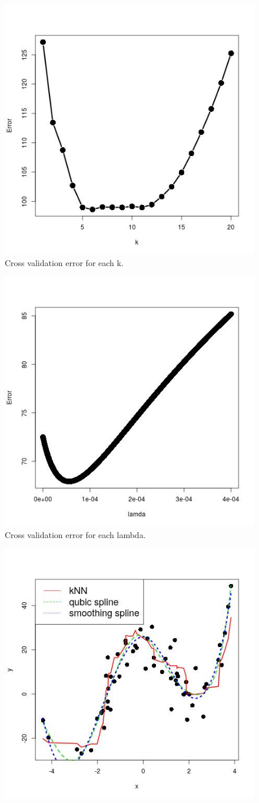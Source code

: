 \documentclass[a4paper, 10pt, english]{article}
\begin{document}
\begin{itemize}
		\begin{figure}[H]
		    \centering
		    \includegraphics[width=0.6\linewidth]{r-script/plots3/k_opt.jpg}
		    \caption{Cross validation error for each k.}
		    \label{fig3:k_opt}
		\end{figure}
		\begin{figure}[H]
		    \centering
		    \includegraphics[width=0.6\linewidth]{r-script/plots3/lambda_opt.jpg}
		    \caption{Cross validation error for each lambda.}
		    \label{fig3:lambda_opt}
		\end{figure}
		\begin{figure}[H]
		    \centering
		    \includegraphics[width=0.6\linewidth]{r-script/plots3/fitted_models.jpg}

\end{figure}
\end{itemize}
\end{document}
